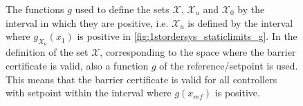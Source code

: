 \begin{figure}[htbp]
	\hspace*{-5mm}
%
\hspace{-2mm}
%
\caption{The functions $g$ used to define the sets $\mathcal{X}$, $\mathcal{X}_u$ and $\mathcal{X}_0$ by the interval in which they are positive, i.e. $\mathcal{X}_u$ is defined by the interval where $g_{X_u}(x_1)$ is positive in \autoref{fig:1stordersys_staticlimits_g}. In the definition of the set $\mathcal{X}$, corresponding to the space where the barrier certificate is valid, also a function $g$ of the reference/setpoint is used. This means that the barrier certificate is valid for all controllers with setpoint within the interval where $g(x_{ref})$ is positive.}
\label{fig:1D_static_gfunctions}
\end{figure}

